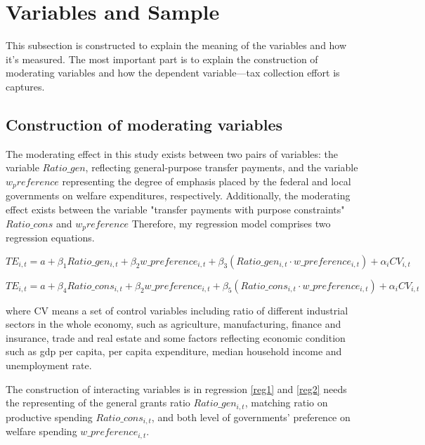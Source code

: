 \section{Variables and Sample}

This subsection is constructed to explain the meaning of the variables and how it's measured. The most important part is to explain the construction of moderating variables and how the dependent variable---tax collection effort is captures.

\subsection{Construction of moderating variables}
The moderating effect in this study exists between two pairs of variables: the variable $Ratio\_gen$, reflecting general-purpose transfer payments, and the variable $w_preference$ representing the degree of emphasis placed by the federal and local governments on welfare expenditures, respectively. Additionally, the moderating effect exists between the variable "transfer payments with purpose constraints" $Ratio\_cons$ and $w_preference$ Therefore, my regression model comprises two regression equations.

\begin{equation}
    TE_{i,t}=a+ \beta_1 Ratio\_gen_{i,t}+\beta_2 w\_preference_{i,t}+\beta_3(Ratio\_gen_{i,t}\cdot w\_preference_{i,t}) +\alpha_i CV_{i,t} \label{reg1}
\end{equation}

\begin{equation}
    TE_{i,t}=a+ \beta_4 Ratio\_cons_{i,t}+\beta_2 w\_preference_{i,t}+\beta_5(Ratio\_cons_{i,t}\cdot w\_preference_{i,t}) +\alpha_i CV_{i,t} \label{reg2}
\end{equation}

where CV means a set of control variables including ratio of different industrial sectors in the whole economy, such as agriculture, manufacturing, finance and insurance, trade and real estate and some factors reflecting economic condition such as gdp per capita, per capita expenditure, median household income and unemployment rate.


The construction of interacting variables is in regression \ref{reg1} and \ref{reg2} needs the representing of the general grants ratio $Ratio\_gen_{i,t}$, matching ratio on productive spending $Ratio\_cons_{i,t}$, and both level of governments' preference on welfare spending $w\_preference_{i,t}$.

